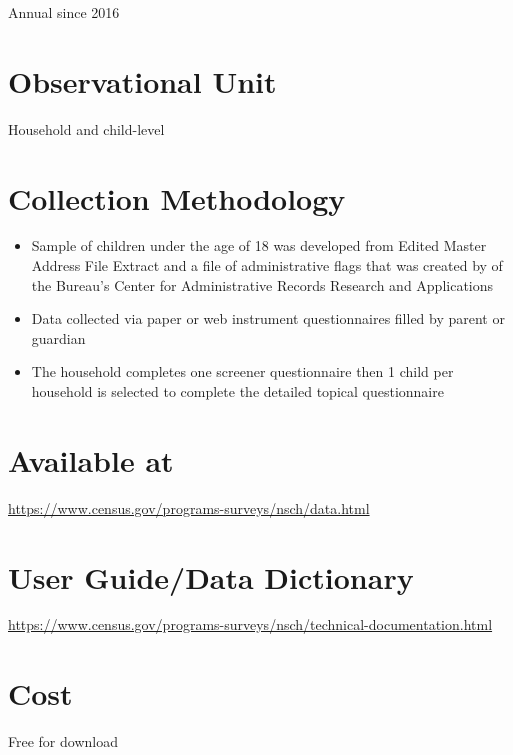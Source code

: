 \documentclass[
]{book}
\providecommand{\tightlist}{%
  \setlength{\itemsep}{0pt}\setlength{\parskip}{0pt}}
\begin{document}
Annual since 2016

\hypertarget{observational-unit-62}{%
\section{Observational Unit}\label{observational-unit-62}}

Household and child-level

\hypertarget{collection-methodology-62}{%
\section{Collection Methodology}\label{collection-methodology-62}}

\begin{itemize}
\tightlist
\item
  Sample of children under the age of 18 was developed from Edited Master Address File Extract and a file of administrative flags that was created by of the Bureau's Center for Administrative Records Research and Applications
\item
  Data collected via paper or web instrument questionnaires filled by parent or guardian
\item
  The household completes one screener questionnaire then 1 child per household is selected to complete the detailed topical questionnaire
\end{itemize}

\hypertarget{available-at-62}{%
\section{Available at}\label{available-at-62}}

\url{https://www.census.gov/programs-surveys/nsch/data.html}

\hypertarget{user-guidedata-dictionary-62}{%
\section{User Guide/Data Dictionary}\label{user-guidedata-dictionary-62}}

\url{https://www.census.gov/programs-surveys/nsch/technical-documentation.html}

\hypertarget{cost-62}{%
\section{Cost}\label{cost-62}}

Free for download
\end{document}
